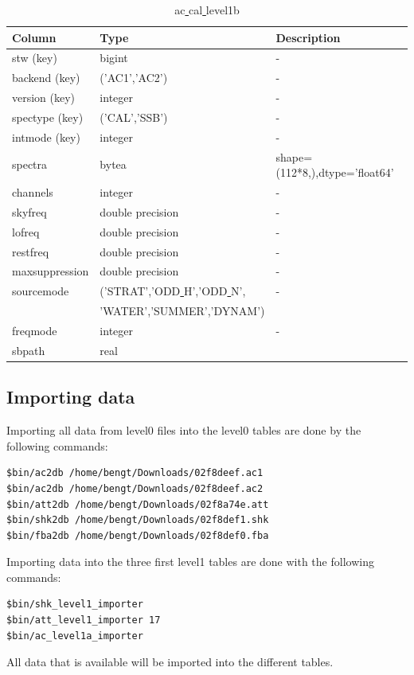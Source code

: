 \documentclass[12pt]{article}
\begin{document}
\begin{table}[ht]
\caption{ac\underline{ }cal\underline{ }level1b}
\centering
\begin{tabular}{l l l}
\hline\hline
Column & Type & Description \\ [0.5ex]
\hline
 stw (key)           & bigint            &- \\
 backend (key)       & ('AC1','AC2')     & -\\
 version (key)       & integer           & -\\
 spectype (key)      & ('CAL','SSB')         & -\\
 intmode (key)       & integer           & -\\
 spectra        & bytea             & shape=(112*8,),dtype='float64'\\
 channels       & integer           & -\\
 skyfreq        & double precision  & -\\
 lofreq         & double precision  & -\\
 restfreq       & double precision  & -\\
 maxsuppression & double precision  & -\\
 sourcemode     & ('STRAT','ODD\underline{ }H','ODD\underline{ }N', & -\\
& 'WATER','SUMMER','DYNAM')   & \\
 freqmode       & integer           & -\\ 
 sbpath         & real              &\\[1ex]
\hline
\end{tabular}
\label{table:ac1a}
\end{table}

\clearpage
\newpage

\subsection{Importing data}
\label{sec:import}
Importing all data from level0 files into the level0 tables are done 
by the following commands:
\begin{verbatim}
$bin/ac2db /home/bengt/Downloads/02f8deef.ac1
$bin/ac2db /home/bengt/Downloads/02f8deef.ac2
$bin/att2db /home/bengt/Downloads/02f8a74e.att
$bin/shk2db /home/bengt/Downloads/02f8def1.shk
$bin/fba2db /home/bengt/Downloads/02f8def0.fba
\end{verbatim}
Importing data into the three first level1 tables are done 
with the following commands:
\begin{verbatim}
$bin/shk_level1_importer
$bin/att_level1_importer 17
$bin/ac_level1a_importer
\end{verbatim}
All data that is available will be imported 
into the different tables. 
\end{document}
